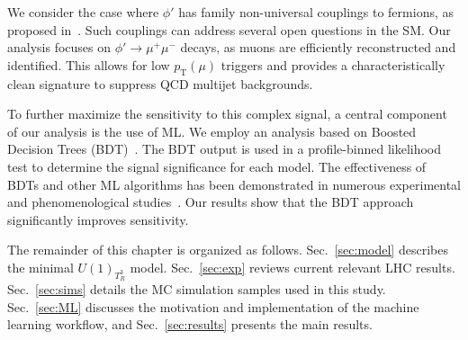 We consider the case where $\phi'$ has family non-universal couplings to fermions, as proposed in~\parencite{Dutta2020}. Such couplings can address several open questions in the SM. Our analysis focuses on $\phi'\to\mu^+\mu^-$ decays, as muons are efficiently reconstructed and identified. This allows for low $p_{\mathrm{T}}(\mu)$ triggers and provides a characteristically clean signature to suppress QCD multijet backgrounds.

To further maximize the sensitivity to this complex signal, a central component of our analysis is the use of ML. We employ an analysis based on Boosted Decision Trees (BDT)~\parencite{friedman_greedy_2001}. The BDT output is used in a profile-binned likelihood test to determine the signal significance for each model. The effectiveness of BDTs and other ML algorithms has been demonstrated in numerous experimental and phenomenological studies~\parencite{Ai:2022qvs, ATLAS:2017fak, Biswas:2018snp, Chung:2020ysf, Feng:2021eke, ttZprime, Chigusa:2022svv, Arganda2024, Ajmal_2024, Dutta_2015}. Our results show that the BDT approach significantly improves sensitivity.


The remainder of this chapter is organized as follows. Sec.~\ref{sec:model} describes the minimal $U(1)_{T^3_R}$ model. Sec.~\ref{sec:exp} reviews current relevant LHC results. Sec.~\ref{sec:sims} details the MC simulation samples used in this study. Sec.~\ref{sec:ML} discusses the motivation and implementation of the machine learning workflow, and Sec.~\ref{sec:results} presents the main results.






